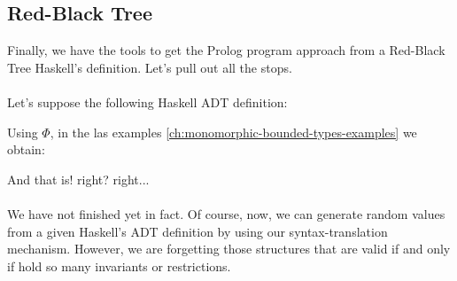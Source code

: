 	\subsection{Red-Black Tree}
	Finally, we have the tools to get the Prolog program approach from a Red-Black Tree Haskell's definition. Let's pull out all the stops.\\\\
	Let's suppose the following Haskell ADT definition:
	
	Using $\Phi$, in the las examples \ref{ch:monomorphic-bounded-types-examples} we obtain:
	
	And that is! right? right...\\\\
	We have not finished yet in fact. Of course, now, we can generate random values from a given Haskell's ADT definition by using our syntax-translation mechanism. However, we are forgetting those structures that are valid if and only if hold so many invariants or restrictions.
